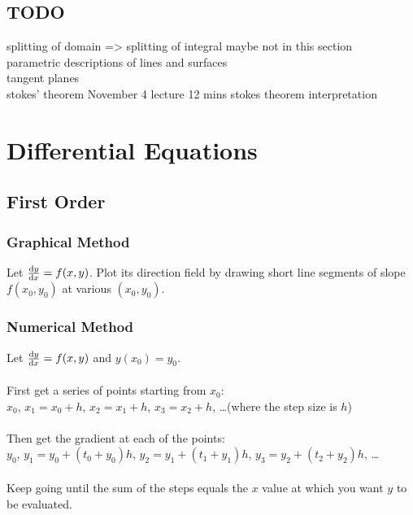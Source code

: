 \documentclass{article}
\begin{document}
			\subsection{TODO}
				splitting of domain => splitting of integral maybe not in this section \\
				parametric descriptions of lines and surfaces \\
				tangent planes \\
				stokes' theorem November 4 lecture 12 mins stokes theorem interpretation\\
	
	
	\section{Differential Equations}
	
		\subsection{First Order}
			
			\subsubsection{Graphical Method}
				Let $\dv{y}{x} = f(x,y)$. Plot its direction field by drawing short line segments of slope $f(x_0,y_0)$ at various $(x_0,y_0)$. \\

			\subsubsection{Numerical Method}
				Let $\dv{y}{x} = f(x,y)$ and $y(x_0) = y_0$. \\
				\\
				First get a series of points starting from $x_0$: \\
				$x_0$, $x_1 = x_0 + h$, $x_2 = x_1 + h$, $x_3 = x_2 + h$, \ldots (where the step size is $h$) \\
				\\
				Then get the gradient at each of the points: \\
				$y_0$, $y_1 = y_0 + (t_0 + y_0)h$, $y_2 = y_1 + (t_1 + y_1)h$, $y_3 = y_2 + (t_2 + y_2)h$, \ldots \\
				\\
				Keep going until the sum of the steps equals the $x$ value at which you want $y$ to be evaluated. \\
\end{document}
